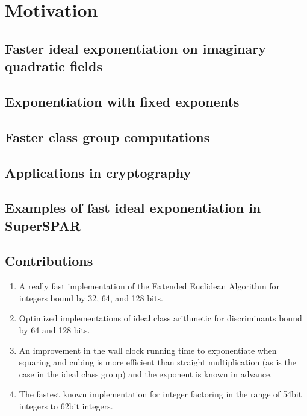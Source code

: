 \documentclass{ucalgthes1}
\theoremstyle{plain}
\theoremstyle{definition}
\begin{document}
\chapter{Motivation}

\section{Faster ideal exponentiation on imaginary quadratic fields}

\section{Exponentiation with fixed exponents}

\section{Faster class group computations}

\section{Applications in cryptography}

\section{Examples of fast ideal exponentiation in SuperSPAR}

\section{Contributions}

\begin{enumerate}
\item A really fast implementation of the Extended Euclidean Algorithm for integers bound by 32, 64, and 128 bits.

\item Optimized implementations of ideal class arithmetic for discriminants bound by 64 and 128 bits.

\item An improvement in the wall clock running time to exponentiate when squaring and cubing is more efficient than straight multiplication (as is the case in the ideal class group) and the exponent is known in advance.

\item The fastest known implementation for integer factoring in the range of 54bit integers to 62bit integers.
\end{enumerate}
\end{document}

